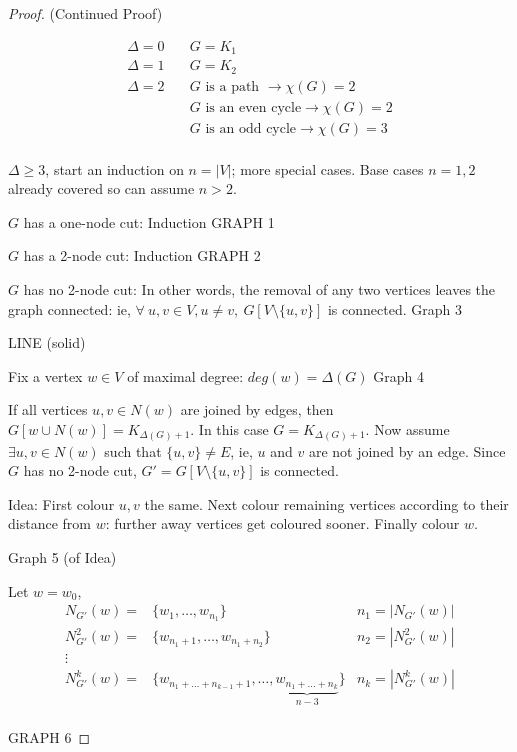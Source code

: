 \documentclass{article}
\begin{document}
\begin{proof}
(Continued  Proof)

\begin{align*}
\Delta=0 & \quad G=K_1 \\
 \Delta=1 & \quad G=K_2 \\
\Delta=2    & \quad G \text{ is a path }\rightarrow \chi(G)=2\\
& \quad G \text{ is an even cycle} \rightarrow \chi(G)=2 \\
& \quad G \text{ is an odd cycle} \rightarrow \chi(G)=3 \\
\end{align*}

$\Delta \geq 3$, start an induction on $n=|V|$; more special cases.  Base cases $n=1,2$ already covered so can assume $n >2$.

$G$ has a one-node cut: Induction GRAPH 1

$G$ has a 2-node cut: Induction GRAPH 2

$G$ has no 2-node cut: In other words, the removal of any two vertices leaves the graph connected: ie, $\forall ~ u,v \in V, u \neq v, ~G[V\setminus \{u,v\}]$ is connected.  Graph 3

LINE (solid)

Fix a vertex $w \in V$ of maximal degree: $deg(w)= \Delta(G)$ Graph 4 

If all vertices $u,v \in N(w)$ are joined by edges, then $G[w \cup N(w)]= K_{\Delta(G)+1}$.  In this case $G = K_{\Delta(G)+1}$.  Now assume $\exists u,v \in N(w)$ such that $\{u,v\} \neq E$, ie, $u$ and $v$ are not joined by an edge.  Since $G$ has no 2-node cut, $G'=G[V \setminus \{u,v\}]$ is connected.

Idea: First colour $u,v$ the same. Next colour remaining vertices according to their distance from $w$: further away vertices get coloured sooner.  Finally colour $w$. 

Graph 5 (of Idea)

Let $w = w_0$,
\begin{align*}
N_{G'}(w) =& \{w_1, \ldots, w_{n_1} \}& n_1 = |N_{G'}(w)| \\
N_{G'}^2(w) =& \{w_{n_1+1}, \ldots, w_{n_1+ n_2} \} & n_2 = |N_{G'}^2(w)|\\
\vdots \\
N_{G'}^k(w) =& \{w_{n_1+\ldots + n_{k-1}+1}, \ldots, \underbrace{w_{n_1+ \ldots + n_k}}_{n-3} \} & n_k = |N_{G'}^k(w)|\\
\end{align*}

GRAPH 6


\end{proof}
\end{document}
